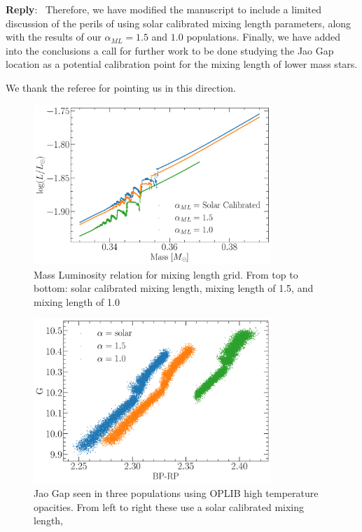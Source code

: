 \documentclass[11pt]{article}
\newcounter{reviewer}
\newcounter{point}[reviewer]
\newenvironment{reply}
   {\medskip \noindent \begin{sf}\textbf{Reply}:\  }
   {\medskip \end{sf}}
\begin{document}
\begin{reply}
	Therefore, we have modified the manuscript to include a limited discussion
	of the perils of using solar calibrated mixing length parameters, along
	with the results of our $\alpha_{ML} = 1.5$ and $1.0$ populations. Finally,
	we have added into the conclusions a call for further work to be done
	studying the Jao Gap location as a potential calibration point for the
	mixing length of lower mass stars.

	We thank the referee for pointing us in this direction.

	\begin{figure}
		\centering
		\includegraphics[width=0.8\textwidth]{./AlphaMLMassLum.pdf}
		\caption{Mass Luminosity relation for mixing length grid. From top to
		bottom: solar calibrated mixing length, mixing length of 1.5, and
		mixing length of 1.0}
		\label{fig:alphaMLML}
	\end{figure}
	\begin{figure}
		\centering
		\includegraphics[width=0.8\textwidth]{./alphaMLComparisionCMD.pdf}
		\caption{Jao Gap seen in three populations using OPLIB high temperature
		opacities. From left to right these use a solar calibrated mixing length,
}
\end{figure}
\end{reply}
\end{document}
